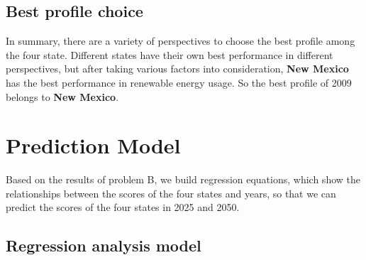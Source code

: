 \documentclass[a4paper,11pt]{article}
\begin{document}
\subsection{Best profile choice}
\par In summary, there are a variety of perspectives to choose the best profile among the four state. Different states have their own best performance in different perspectives, but after taking various factors into consideration,  \textbf{New Mexico} has the best performance in renewable energy usage.
So the best profile of 2009 belongs to \textbf{New Mexico}.


\section{Prediction Model}
\par Based on the results of problem B, we build regression equations, which show the relationships between the scores of the four states and years, so that we can predict the scores of the four states in 2025 and 2050.
\subsection{Regression analysis model}  
\end{document}
